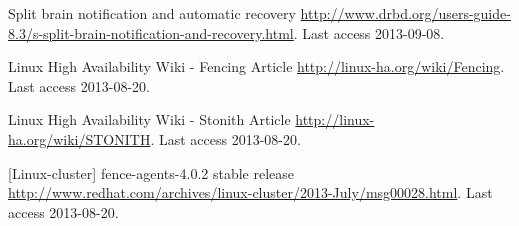 \begin{thebibliography}{1}
 Split brain notification and automatic recovery
\url{http://www.drbd.org/users-guide-8.3/s-split-brain-notification-and-recovery.html}. Last access 2013-09-08.


 Linux High Availability Wiki - Fencing Article
\url{http://linux-ha.org/wiki/Fencing}. Last access 2013-08-20.

 Linux High Availability Wiki - Stonith Article
\url{http://linux-ha.org/wiki/STONITH}. Last access 2013-08-20.

 [Linux-cluster] fence-agents-4.0.2 stable release
\url{http://www.redhat.com/archives/linux-cluster/2013-July/msg00028.html}. Last access 2013-08-20.


\end{thebibliography}

